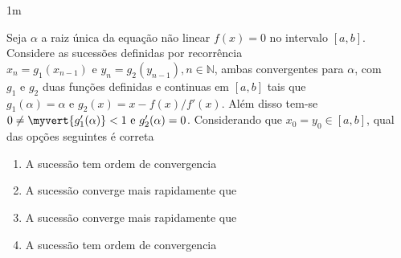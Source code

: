 \documentclass[CN_A-Tests_Resolutions.tex]{subfiles}
\begin{document}
\begin{questionBox}1m{} %

  Seja \(\alpha\) a raiz única da equação não linear \(f(x)=0\) no intervalo \([a,b]\). Considere as sucessões definidas por recorrência \(x_n=g_1(x_{n-1})\text{ e }y_n=g_2(y_{n-1}),n\in\mathbb{N}\), ambas convergentes para \(\alpha\), com \(g_1\text{ e }g_2\) duas funções definidas e continuas em \([a,b]\) tais que \(g_1(\alpha)=\alpha\text{ e }g_2(x)=x-f(x)/f'(x)\). Além disso tem-se \(0\neq\myvert{g'_1(\alpha)}<1\text{ e }g'_2(\alpha)=0\). Considerando que \(x_0=y_0\in{[a,b]}\), qual das opções seguintes é correta
  \begin{enumerate}[label=\alph{enumi}.]
    \item A sucessão  tem ordem de convergencia 
    \item A sucessão  converge mais rapidamente que 
    \item A sucessão  converge mais rapidamente que 
    \item A sucessão  tem ordem de convergencia 
  \end{enumerate}


\end{questionBox}
\end{document}
